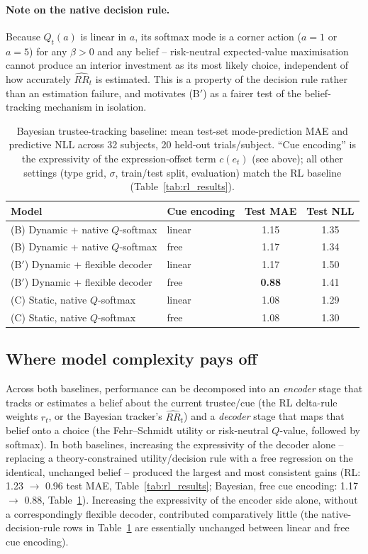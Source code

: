 \documentclass[11pt]{article}
\begin{document}
\paragraph{Note on the native decision rule.}
Because $Q_t(a)$ is linear in $a$, its softmax mode is a corner action
($a{=}1$ or $a{=}5$) for any $\beta>0$ and any belief -- risk-neutral
expected-value maximisation cannot produce an interior investment as its
most likely choice, independent of how accurately $\widehat{RR}_t$ is
estimated. This is a property of the decision rule rather than an
estimation failure, and motivates (B$'$) as a fairer test of the
belief-tracking mechanism in isolation.

\begin{table}[h]
\centering
\begin{tabular}{llcc}
\toprule
Model & Cue encoding & Test MAE & Test NLL \\
\midrule
(B) Dynamic + native $Q$-softmax  & linear & 1.15 & 1.35 \\
(B) Dynamic + native $Q$-softmax  & free   & 1.17 & 1.34 \\
(B$'$) Dynamic + flexible decoder & linear & 1.17 & 1.50 \\
(B$'$) Dynamic + flexible decoder & free   & \textbf{0.88} & 1.41 \\
(C) Static, native $Q$-softmax    & linear & 1.08 & 1.29 \\
(C) Static, native $Q$-softmax    & free   & 1.08 & 1.30 \\
\bottomrule
\end{tabular}
\caption{Bayesian trustee-tracking baseline: mean test-set
mode-prediction MAE and predictive NLL across 32 subjects, 20 held-out
trials/subject. ``Cue encoding'' is the expressivity of the
expression-offset term $c(e_t)$ (see above); all other settings (type
grid, $\sigma$, train/test split, evaluation) match the RL baseline
(Table~\ref{tab:rl_results}).}
\label{tab:bayes_results}
\end{table}

\subsection*{Where model complexity pays off}

Across both baselines, performance can be decomposed into an
\emph{encoder} stage that tracks or estimates a belief about the current
trustee/cue (the RL delta-rule weights $r_t$, or the Bayesian tracker's
$\widehat{RR}_t$) and a \emph{decoder} stage that maps that belief onto a
choice (the Fehr--Schmidt utility or risk-neutral $Q$-value, followed by
softmax). In both baselines, increasing the expressivity of the decoder
alone -- replacing a theory-constrained utility/decision rule with a free
regression on the identical, unchanged belief -- produced the largest and
most consistent gains (RL: 1.23 $\to$ 0.96 test MAE, Table~\ref{tab:rl_results};
Bayesian, free cue encoding: 1.17 $\to$ 0.88, Table~\ref{tab:bayes_results}).
Increasing the expressivity of the encoder side alone, without a
correspondingly flexible decoder, contributed comparatively little (the
native-decision-rule rows in Table~\ref{tab:bayes_results} are essentially
unchanged between linear and free cue encoding).
\end{document}
